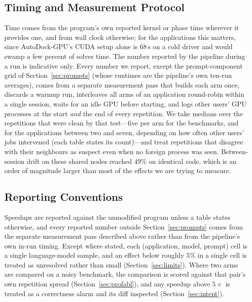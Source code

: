 \subsection{Timing and Measurement Protocol}
\label{sec:timing}
Time comes from the program's own reported kernel or phase time wherever it provides one, and from wall
clock otherwise; for the applications this matters, since AutoDock-GPU's CUDA setup alone is $68$\,s on
a cold driver and would swamp a few percent of solver time. The number reported by the pipeline during
a run is indicative only. Every number we report, except the prompt-component grid of
Section~\ref{sec:prompts} (whose runtimes are the pipeline's own ten-run averages), comes from a
separate measurement pass that builds
each arm once, discards a warmup run, interleaves all arms of an application round-robin within a
single session, waits for an idle GPU before starting, and logs other users' GPU processes at the start
\emph{and} the end of every repetition. We take medians over the repetitions that were clean by that
test---five per arm for the benchmarks, and for the applications between two and seven, depending on
how often other users' jobs intervened (each table states its count)---and treat repetitions that disagree with their neighbours as suspect even when no foreign
process was seen. Between-session drift on these shared nodes reached $49\%$ on identical code, which
is an order of magnitude larger than most of the effects we are trying to measure.

\subsection{Reporting Conventions}
Speedups are reported against the unmodified program unless a table states otherwise, and every
reported number outside Section~\ref{sec:prompts} comes from the separate measurement pass described
above rather than from the pipeline's own in-run timing. Except where stated, each (application, model, prompt) cell is a
single language-model sample, and an effect below roughly $5\%$ in a single cell is treated as
unresolved rather than small (Section~\ref{sec:limits}). Where two arms are compared on a noisy
benchmark, the comparison is scored against that pair's own repetition spread
(Section~\ref{sec:profabl}), and any speedup above $5\times$ is treated as a correctness alarm and
its diff inspected (Section~\ref{sec:intent}).
